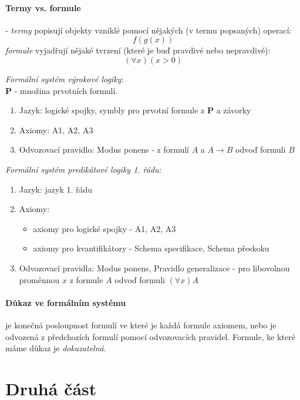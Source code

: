 \documentclass[a4paper]{article}      %
\newenvironment{example}[1][Příklad]{\begin{trivlist}
\item[\hskip \labelsep {\bfseries #1}]}{\end{trivlist}}
\begin{document}
\paragraph{Termy vs. formule} - \emph{termy} popisují objekty vzniklé pomocí nějakých (v termu popsaných) operací:
\[
f(g(x))
\]
\emph{formule} vyjadřují nějaké tvrzení (které je buď pravdivé nebo nepravdivé):
\[
(\forall x)  (x > 0)
\]

\begin{example}
\emph{Formální systém výrokové logiky}:\\
\textbf{P} - množina prvotních formulí.
\begin{enumerate}
\item Jazyk: logické spojky, symbly pro prvotní formule z \textbf{P} a závorky
\item Axiomy: A1, A2, A3
\item Odvozovací pravidlo: Modus ponens - z formulí $A$ a $A \rightarrow B$ odvoď formuli $B$  
\end{enumerate}
\end{example}

\begin{example}
\emph{Formální systém predikátové logiky 1. řádu:}
\begin{enumerate}
\item Jazyk: jazyk 1. řádu
\item Axiomy: 	\begin{itemize}
			\item axiomy pro logické spojky - A1, A2, A3
			\item axiomy pro kvantifikátory - Schema specifikace, Schema přeskoku
		\end{itemize}
\item Odvozovací pravidla: Modus ponens, Pravidlo generalizace - pro libovolnou proměnnou $x$ z formule $A$ odvoď formuli $(\forall x)A$
\end{enumerate}
\end{example}

\paragraph{Důkaz ve formálním systému} je konečná posloupnost formulí ve které je každá formule axiomem, nebo je odvozená z předchozích formulí pomocí odvozovacích pravidel. Formule, ke které máme důkaz je \emph{dokazatelná}.

\section{Druhá část}
\end{document}
